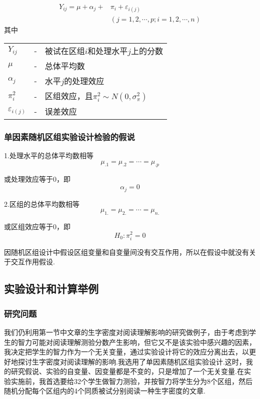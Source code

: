 \begin{definition}[单因素随机区组设计模型]
\begin{align*}
    Y_{ij} = \mu + \alpha _j +  & \pi _i + \varepsilon _{i\left(j\right)}\\
                                & \left( j=1,2,\cdots , p;i = 1,2,\cdots,n \right)
\end{align*}
其中

\begin{tabular}{lcl}
    $Y_{ij}$ & - & 被试在区组$i$和处理水平$j$上的分数 \\
    $\mu$ & - & 总体平均数 \\
    $\alpha _j$ & - & 水平$j$的处理效应 \\
    $\pi _i ^2$ & - & 区组效应，且$\pi _i ^2\sim N\left(0,\sigma _\pi ^2\right)$\\
    $\varepsilon_{i \left( j \right)}$ & - & 误差效应 \\
\end{tabular}
\end{definition}


%
%
%
%
\subsubsection{单因素随机区组实验设计检验的假说}



1.处理水平的总体平均数相等
\[ \mu _{.1} = \mu _{.2} = \cdots = \mu _{.p} \]

或处理效应等于0，即
\[ \alpha _j = 0 \]

2.区组的总体平均数相等
\[ \mu _{1.} = \mu _{2.} = \cdots = \mu _{n.} \]

或区组效应等于0，即
\[ H_0 : \pi _i ^2 = 0\]

因随机区组设计中假设区组变量和自变量间没有交互作用，所以在假设中就没有关于交互作用假设.

\subsection{实验设计和计算举例}
\subsubsection{研究问题}
我们仍利用第一节中文章的生字密度对阅读理解影响的研究做例子，由于考虑到学生的智力可能对阅读理解测验分数产生影响，但它又不是该实验中感兴趣的因素，我决定把学生的智力作为一个无关变量，通过实验设计将它的效应分离出去，以更好地探讨生字密度对阅读理解的影响.我选用了单因素随机区组实验设计.这时，我的研究假说、实验的自变量、因变量都是不变的，只是增加了一个无关变量.在实验实施前，我首选要给32个学生做智力测验，并按智力将学生分为8个区组，然后随机分配每个区组内的4个同质被试分别阅读一种生字密度的文章.

